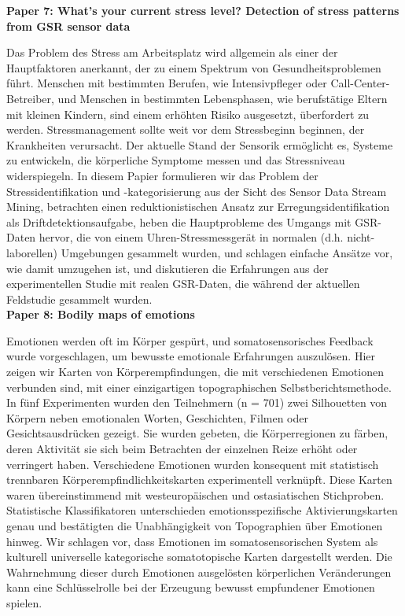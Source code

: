 \textbf{Paper 7: What’s your current stress level? Detection of stress patterns from GSR sensor data}

Das Problem des Stress am Arbeitsplatz wird allgemein als einer der Hauptfaktoren anerkannt, der zu einem Spektrum von Gesundheitsproblemen führt. 
Menschen mit bestimmten Berufen, wie Intensivpfleger oder Call-Center-Betreiber, und Menschen in bestimmten Lebensphasen, wie berufstätige Eltern mit kleinen Kindern, sind einem erhöhten Risiko ausgesetzt, überfordert zu werden. 
Stressmanagement sollte weit vor dem Stressbeginn beginnen, der Krankheiten verursacht. 
Der aktuelle Stand der Sensorik ermöglicht es, Systeme zu entwickeln, die körperliche Symptome messen und das Stressniveau widerspiegeln. 
In diesem Papier formulieren wir das Problem der Stressidentifikation und -kategorisierung aus der Sicht des Sensor Data Stream Mining, betrachten einen reduktionistischen Ansatz zur Erregungsidentifikation als Driftdetektionsaufgabe, heben die Hauptprobleme des Umgangs mit GSR-Daten hervor, die von einem Uhren-Stressmessgerät in normalen (d.h. nicht-laborellen) Umgebungen gesammelt wurden, und schlagen einfache Ansätze vor, wie damit umzugehen ist, und diskutieren die Erfahrungen aus der experimentellen Studie mit realen GSR-Daten, die während der aktuellen Feldstudie gesammelt wurden. \\


\textbf{Paper 8: Bodily maps of emotions}

Emotionen werden oft im Körper gespürt, und somatosensorisches Feedback wurde vorgeschlagen, um bewusste emotionale Erfahrungen auszulösen. 
Hier zeigen wir Karten von Körperempfindungen, die mit verschiedenen Emotionen verbunden sind, mit einer einzigartigen topographischen Selbstberichtsmethode. 
In fünf Experimenten wurden den Teilnehmern (n = 701) zwei Silhouetten von Körpern neben emotionalen Worten, Geschichten, Filmen oder Gesichtsausdrücken gezeigt. Sie wurden gebeten, die Körperregionen zu färben, deren Aktivität sie sich beim Betrachten der einzelnen Reize erhöht oder verringert haben. 
Verschiedene Emotionen wurden konsequent mit statistisch trennbaren Körperempfindlichkeitskarten experimentell verknüpft. 
Diese Karten waren übereinstimmend mit westeuropäischen und ostasiatischen Stichproben. Statistische Klassifikatoren unterschieden emotionsspezifische Aktivierungskarten genau und bestätigten die Unabhängigkeit von Topographien über Emotionen hinweg. Wir schlagen vor, dass Emotionen im somatosensorischen System als kulturell universelle kategorische somatotopische Karten dargestellt werden. Die Wahrnehmung dieser durch Emotionen ausgelösten körperlichen Veränderungen kann eine Schlüsselrolle bei der Erzeugung bewusst empfundener Emotionen spielen. \\


